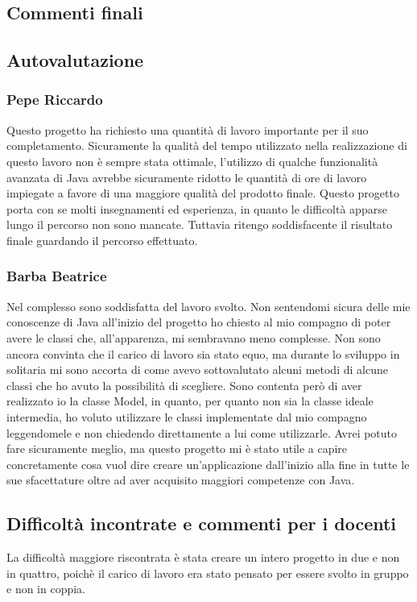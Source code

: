\documentclass[a4paper,12pt]{report}
\begin{document}
\begin{flushleft}
\chapter{Commenti finali}

\section{Autovalutazione}

\subsection{Pepe Riccardo}

Questo progetto ha richiesto una quantità di lavoro importante per il suo completamento. Sicuramente la qualità del tempo utilizzato nella realizzazione di questo lavoro non è sempre stata ottimale, l'utilizzo di qualche funzionalità avanzata di Java avrebbe sicuramente ridotto le quantità di ore di lavoro impiegate a favore di una maggiore qualità del prodotto finale. Questo progetto porta con se molti insegnamenti ed esperienza, in quanto le difficoltà apparse lungo il percorso non sono mancate. Tuttavia ritengo soddisfacente il risultato finale guardando il percorso effettuato.

\subsection{Barba Beatrice}
Nel complesso sono soddisfatta del lavoro svolto. Non sentendomi sicura delle mie conoscenze di Java all'inizio del progetto ho chiesto al mio compagno di poter avere le classi che, all'apparenza, mi sembravano meno complesse. Non sono ancora convinta che il carico di lavoro sia stato equo, ma durante lo sviluppo in solitaria mi sono accorta di come avevo sottovalutato alcuni metodi di alcune classi che ho avuto la possibilità di scegliere. Sono contenta però di aver realizzato io la classe Model, in quanto, per quanto non sia la classe ideale intermedia, ho voluto utilizzare le classi implementate dal mio compagno  leggendomele e non chiedendo direttamente a lui come utilizzarle. Avrei potuto fare sicuramente meglio, ma questo progetto mi è stato utile a capire concretamente cosa vuol dire creare un'applicazione dall'inizio alla fine in tutte le sue sfacettature oltre ad aver acquisito maggiori competenze con Java.

\section{Difficoltà incontrate e commenti per i docenti}
La difficoltà maggiore riscontrata è stata creare un intero progetto in due e non in quattro, poichè il carico di lavoro era stato pensato per essere svolto in gruppo e non in coppia.



\end{flushleft}
\end{document}
